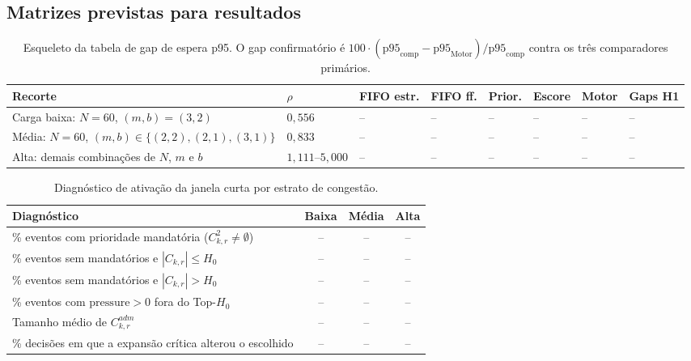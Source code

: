 \documentclass[
  12pt,
  oneside,
  a4paper,
  sumario=tradicional,
  brazil
]{abntex2}
\begin{document}
\begin{apendicesenv}
\section{Matrizes previstas para resultados}

\begin{table}[H]
\centering
\scriptsize
\setlength{\tabcolsep}{3pt}
\renewcommand{\arraystretch}{1.16}
\begin{tabularx}{\textwidth}{@{}P{0.24\textwidth}C{0.12\textwidth}C{0.085\textwidth}C{0.095\textwidth}C{0.095\textwidth}C{0.085\textwidth}C{0.075\textwidth}Y@{}}
\toprule
{}
\textbf{Recorte} & \textbf{$\rho$} & \textbf{FIFO estr.} & \textbf{FIFO ff.} & \textbf{Prior.} & \textbf{Escore} & \textbf{Motor} & \textbf{Gaps H1} \\
\midrule
Carga baixa: $N=60$, $(m,b)=(3,2)$ & $0{,}556$ & -- & -- & -- & -- & -- & -- \\
M\'edia: $N=60$, $(m,b)\in\{(2,2),(2,1),(3,1)\}$ & $0{,}833$ & -- & -- & -- & -- & -- & -- \\
Alta: demais combina\c{c}\~oes de $N$, $m$ e $b$ & $1{,}111$--$5{,}000$ & -- & -- & -- & -- & -- & -- \\
\bottomrule
\end{tabularx}
\caption[Gap de espera p95]{Esqueleto da tabela de gap de espera p95. O gap confirmat\'orio \'e $100\cdot(\mathrm{p95}_{\mathrm{comp}}-\mathrm{p95}_{\mathrm{Motor}})/\mathrm{p95}_{\mathrm{comp}}$ contra os tr\^es comparadores prim\'arios.}
\label{tab:gap-espera-p95-previsto}
\end{table}

\begin{table}[H]
\centering
\small
\setlength{\tabcolsep}{5pt}
\renewcommand{\arraystretch}{1.16}
\begin{tabular}{@{}p{8cm}ccc@{}}
\toprule
\rowcolor{tablehead}
\textbf{Diagn\'ostico} & \textbf{Baixa} & \textbf{M\'edia} & \textbf{Alta} \\
\midrule
\% eventos com prioridade mandat\'oria ($C^{2}_{k,r} \neq \emptyset$) & -- & -- & -- \\
\% eventos sem mandat\'orios e $|C_{k,r}| \leq H_0$ & -- & -- & -- \\
\% eventos sem mandat\'orios e $|C_{k,r}| > H_0$ & -- & -- & -- \\
\% eventos com $\mathrm{pressure}>0$ fora do Top-$H_0$ & -- & -- & -- \\
Tamanho m\'edio de $C^{adm}_{k,r}$ & -- & -- & -- \\
\% decis\~oes em que a expans\~ao cr\'itica alterou o escolhido & -- & -- & -- \\
\bottomrule
\end{tabular}
\caption[Ativa\c{c}\~ao da janela curta]{Diagn\'ostico de ativa\c{c}\~ao da janela curta por estrato de congest\~ao.}
\label{tab:diag-h}
\end{table}


\end{apendicesenv}
\end{document}

